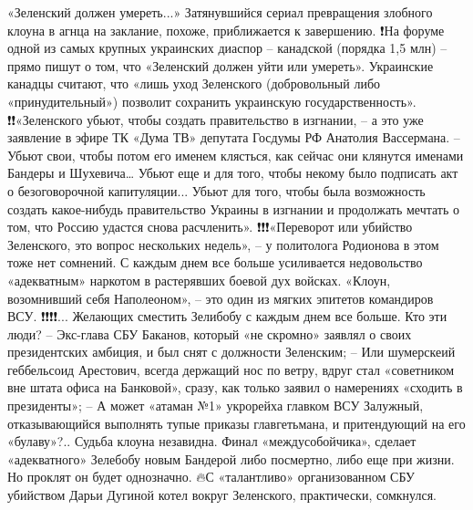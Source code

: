 «Зеленский должен умереть...»
Затянувшийся сериал превращения злобного клоуна в агнца на заклание, похоже, приближается к завершению.
❗️На форуме одной из самых крупных украинских диаспор – канадской (порядка 1,5 млн) – прямо пишут о том, что «Зеленский должен уйти или умереть». Украинские канадцы считают, что «лишь уход Зеленского (добровольный либо «принудительный») позволит сохранить украинскую государственность».
❗️❗️«Зеленского убьют, чтобы создать правительство в изгнании, – а это уже заявление в эфире ТК «Дума ТВ» депутата Госдумы РФ Анатолия Вассермана. – Убьют свои, чтобы потом его именем клясться, как сейчас они клянутся именами Бандеры и Шухевича… Убьют еще и для того, чтобы некому было подписать акт о безоговорочной капитуляции... Убьют для того, чтобы была возможность создать какое-нибудь правительство Украины в изгнании и продолжать мечтать о том, что Россию удастся снова расчленить».
❗️❗️❗️«Переворот или убийство Зеленского, это вопрос нескольких недель», – у политолога Родионова в этом тоже нет сомнений. С каждым днем все больше усиливается недовольство «адекватным» наркотом в растерявших боевой дух войсках. «Клоун, возомнивший себя Наполеоном», – это один из мягких эпитетов командиров ВСУ.
❗️❗️❗️❗️...
Желающих сместить Зелибобу с каждым днем все больше. Кто эти люди?
– Экс-глава СБУ Баканов, который «не скромно» заявлял о своих президентских амбиция, и был снят с должности Зеленским;
– Или шумерскеий геббельсоид Арестович, всегда держащий нос по ветру, вдруг стал «советником вне штата офиса на Банковой», сразу, как только заявил о намерениях «сходить в президенты»;
– А может «атаман №1» укрорейха главком ВСУ Залужный, отказывающийся выполнять тупые приказы главгетьмана, и притендующий на его «булаву»?..
Судьба клоуна незавидна. Финал «междусобойчика», сделает «адекватного» Зелебобу новым Бандерой либо посмертно, либо еще при жизни. Но проклят он будет однозначно.
🔥С «талантливо» организованном СБУ убийством Дарьи Дугиной котел вокруг Зеленского, практически, сомкнулся.

